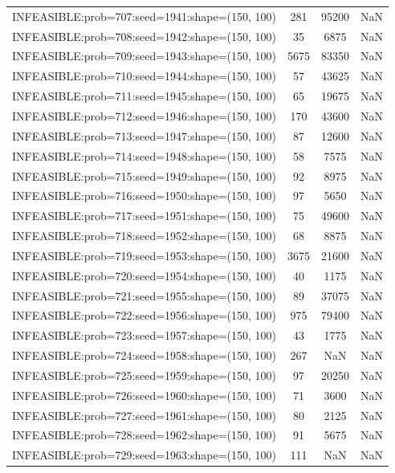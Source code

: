 \begin{longtable}{lccc}
INFEASIBLE:prob=707:seed=1941:shape=(150, 100) &   281 & 95200 &    NaN \\
INFEASIBLE:prob=708:seed=1942:shape=(150, 100) &    35 &  6875 &    NaN \\
INFEASIBLE:prob=709:seed=1943:shape=(150, 100) &  5675 & 83350 &    NaN \\
INFEASIBLE:prob=710:seed=1944:shape=(150, 100) &    57 & 43625 &    NaN \\
INFEASIBLE:prob=711:seed=1945:shape=(150, 100) &    65 & 19675 &    NaN \\
INFEASIBLE:prob=712:seed=1946:shape=(150, 100) &   170 & 43600 &    NaN \\
INFEASIBLE:prob=713:seed=1947:shape=(150, 100) &    87 & 12600 &    NaN \\
INFEASIBLE:prob=714:seed=1948:shape=(150, 100) &    58 &  7575 &    NaN \\
INFEASIBLE:prob=715:seed=1949:shape=(150, 100) &    92 &  8975 &    NaN \\
INFEASIBLE:prob=716:seed=1950:shape=(150, 100) &    97 &  5650 &    NaN \\
INFEASIBLE:prob=717:seed=1951:shape=(150, 100) &    75 & 49600 &    NaN \\
INFEASIBLE:prob=718:seed=1952:shape=(150, 100) &    68 &  8875 &    NaN \\
INFEASIBLE:prob=719:seed=1953:shape=(150, 100) &  3675 & 21600 &    NaN \\
INFEASIBLE:prob=720:seed=1954:shape=(150, 100) &    40 &  1175 &    NaN \\
INFEASIBLE:prob=721:seed=1955:shape=(150, 100) &    89 & 37075 &    NaN \\
INFEASIBLE:prob=722:seed=1956:shape=(150, 100) &   975 & 79400 &    NaN \\
INFEASIBLE:prob=723:seed=1957:shape=(150, 100) &    43 &  1775 &    NaN \\
INFEASIBLE:prob=724:seed=1958:shape=(150, 100) &   267 &   NaN &    NaN \\
INFEASIBLE:prob=725:seed=1959:shape=(150, 100) &    97 & 20250 &    NaN \\
INFEASIBLE:prob=726:seed=1960:shape=(150, 100) &    71 &  3600 &    NaN \\
INFEASIBLE:prob=727:seed=1961:shape=(150, 100) &    80 &  2125 &    NaN \\
INFEASIBLE:prob=728:seed=1962:shape=(150, 100) &    91 &  5675 &    NaN \\
INFEASIBLE:prob=729:seed=1963:shape=(150, 100) &   111 &   NaN &    NaN \\

\end{longtable}
